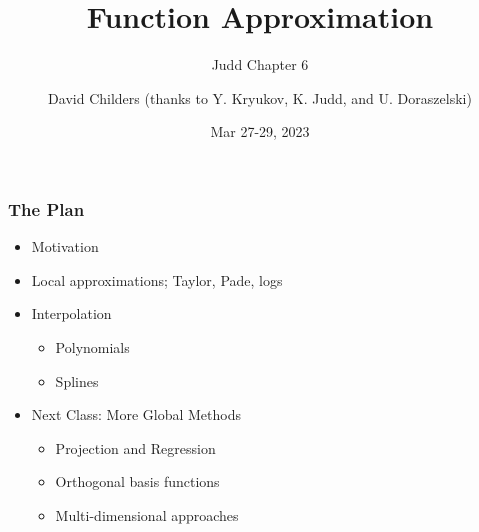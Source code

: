 \documentclass[bigger]{beamer}
\begin{document}
\title[47-809: Function Approximation]{Function Approximation}
\subtitle{Judd Chapter 6}
\author[David Childers]{David Childers (thanks to Y. Kryukov, K. Judd, and U. Doraszelski)}
\date[Mar.27-29]{Mar 27-29, 2023}
\maketitle

\begin{frame}%

\frametitle{The Plan}

\begin{itemize}
\item Motivation

\item Local approximations; Taylor, Pade, logs



\item Interpolation
\begin{itemize}
\item Polynomials
\item Splines
\end{itemize}

\item Next Class: More Global Methods 

\begin{itemize}
\item Projection and Regression

\item Orthogonal basis functions

\item Multi-dimensional approaches
\end{itemize}



\end{itemize}


\end{frame}%
\end{document}

